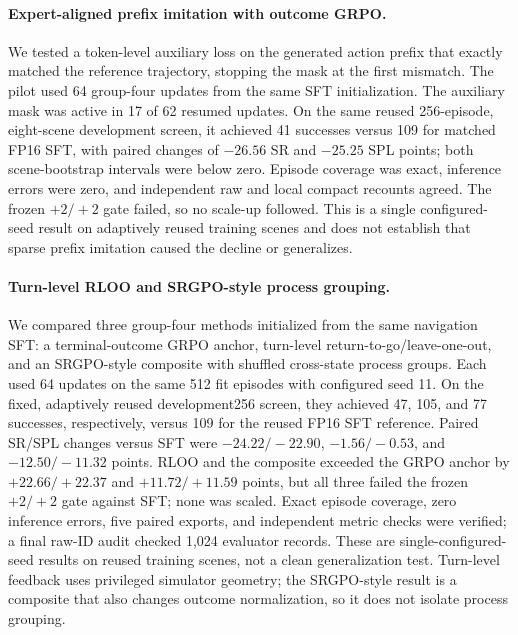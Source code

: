 \documentclass[10pt,twocolumn,letterpaper]{article}
\begin{document}
\paragraph{Expert-aligned prefix imitation with outcome GRPO.} We tested a
token-level auxiliary loss on the generated action prefix that exactly matched
the reference trajectory, stopping the mask at the first mismatch. The pilot
used 64 group-four updates from the same SFT initialization. The auxiliary
mask was active in 17 of 62 resumed updates. On the same reused 256-episode,
eight-scene development screen, it achieved 41 successes versus 109 for
matched FP16 SFT, with paired changes of $-26.56$ SR and $-25.25$ SPL points;
both scene-bootstrap intervals were below zero. Episode coverage was exact,
inference errors were zero, and independent raw and local compact recounts
agreed. The frozen $+2/+2$ gate failed, so no scale-up followed. This is a
single configured-seed result on adaptively reused training scenes and does
not establish that sparse prefix imitation caused the decline or generalizes.


\paragraph{Turn-level RLOO and SRGPO-style process grouping.} We compared
three group-four methods initialized from the same navigation SFT: a
terminal-outcome GRPO anchor, turn-level return-to-go/leave-one-out, and an
SRGPO-style composite with shuffled cross-state process groups. Each used 64
updates on the same 512 fit episodes with configured seed 11. On the fixed,
adaptively reused development256 screen, they achieved 47, 105, and 77
successes, respectively, versus 109 for the reused FP16 SFT reference.
Paired SR/SPL changes versus SFT were $-24.22/-22.90$, $-1.56/-0.53$, and
$-12.50/-11.32$ points. RLOO and the composite exceeded the GRPO anchor by
$+22.66/+22.37$ and $+11.72/+11.59$ points, but all three failed the frozen
$+2/+2$ gate against SFT; none was scaled. Exact episode coverage, zero
inference errors, five paired exports, and independent metric checks were
verified; a final raw-ID audit checked 1,024 evaluator records. These are
single-configured-seed results on reused training scenes, not a clean
generalization test. Turn-level feedback uses privileged simulator geometry;
the SRGPO-style result is a composite that also changes outcome
normalization, so it does not isolate process grouping.
\end{document}
